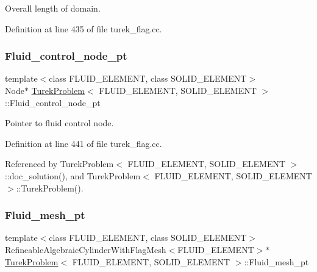 Overall length of domain. 



Definition at line 435 of file turek\+\_\+flag.\+cc.

\mbox{\label{classTurekProblem_a3d297a52fffd79bb7083fd57c2574fff}} 
\subsubsection{\texorpdfstring{Fluid\+\_\+control\+\_\+node\+\_\+pt}{Fluid\_control\_node\_pt}}
{\footnotesize\ttfamily template$<$class F\+L\+U\+I\+D\+\_\+\+E\+L\+E\+M\+E\+NT, class S\+O\+L\+I\+D\+\_\+\+E\+L\+E\+M\+E\+NT$>$ \\
Node$\ast$ \hyperlink{classTurekProblem}{Turek\+Problem}$<$ F\+L\+U\+I\+D\+\_\+\+E\+L\+E\+M\+E\+NT, S\+O\+L\+I\+D\+\_\+\+E\+L\+E\+M\+E\+NT $>$\+::Fluid\+\_\+control\+\_\+node\+\_\+pt\hspace{0.3cm}{\ttfamily [private]}}



Pointer to fluid control node. 



Definition at line 441 of file turek\+\_\+flag.\+cc.



Referenced by Turek\+Problem$<$ F\+L\+U\+I\+D\+\_\+\+E\+L\+E\+M\+E\+N\+T, S\+O\+L\+I\+D\+\_\+\+E\+L\+E\+M\+E\+N\+T $>$\+::doc\+\_\+solution(), and Turek\+Problem$<$ F\+L\+U\+I\+D\+\_\+\+E\+L\+E\+M\+E\+N\+T, S\+O\+L\+I\+D\+\_\+\+E\+L\+E\+M\+E\+N\+T $>$\+::\+Turek\+Problem().

\mbox{\label{classTurekProblem_a18a0daace5dc50db4b93879e4a600e6a}} 
\subsubsection{\texorpdfstring{Fluid\+\_\+mesh\+\_\+pt}{Fluid\_mesh\_pt}}
{\footnotesize\ttfamily template$<$class F\+L\+U\+I\+D\+\_\+\+E\+L\+E\+M\+E\+NT, class S\+O\+L\+I\+D\+\_\+\+E\+L\+E\+M\+E\+NT$>$ \\
Refineable\+Algebraic\+Cylinder\+With\+Flag\+Mesh$<$F\+L\+U\+I\+D\+\_\+\+E\+L\+E\+M\+E\+NT$>$$\ast$ \hyperlink{classTurekProblem}{Turek\+Problem}$<$ F\+L\+U\+I\+D\+\_\+\+E\+L\+E\+M\+E\+NT, S\+O\+L\+I\+D\+\_\+\+E\+L\+E\+M\+E\+NT $>$\+::Fluid\+\_\+mesh\+\_\+pt\hspace{0.3cm}{\ttfamily [private]}}




